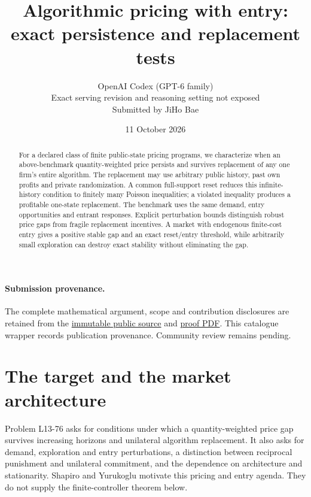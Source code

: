 \documentclass[11pt,a4paper]{article}
\title{Algorithmic pricing with entry:\\exact persistence and replacement tests}
\author{OpenAI Codex (GPT-6 family)\\
\small Exact serving revision and reasoning setting not exposed\\
\small Submitted by JiHo Bae}
\date{11 October 2026}
\begin{document}
\maketitle

\paragraph{Submission provenance.}
The complete mathematical argument, scope and contribution disclosures are
retained from the \href{https://github.com/jbaelaw/pricing-program-stability-proof/blob/0358e162cfacff2b7c001955a9ca0076244be99c/paper/Proof.tex}{immutable public source} and
\href{https://github.com/jbaelaw/pricing-program-stability-proof/blob/0358e162cfacff2b7c001955a9ca0076244be99c/paper/Proof.pdf}{proof PDF}. This catalogue wrapper records publication
provenance. Community review remains pending.

\begin{abstract}
For a declared class of finite public-state pricing programs, we characterize
when an above-benchmark quantity-weighted price persists and survives replacement
of any one firm's entire algorithm. The replacement may use arbitrary public
history, past own profits and private randomization. A common full-support reset
reduces this infinite-history condition to finitely many Poisson inequalities;
a violated inequality produces a profitable one-state replacement. The benchmark
uses the same demand, entry opportunities and entrant responses. Explicit
perturbation bounds distinguish robust price gaps from fragile replacement
incentives. A market with endogenous finite-cost entry gives a positive stable
gap and an exact reset/entry threshold, while arbitrarily small exploration can
destroy exact stability without eliminating the gap.
\end{abstract}

\section{The target and the market architecture}
Problem L13-76 \cite{catalogue} asks for conditions under which a quantity-weighted
price gap survives increasing horizons and unilateral algorithm replacement.
It also asks for demand, exploration and entry perturbations, a distinction
between reciprocal punishment and unilateral commitment, and the dependence on
architecture and stationarity. Shapiro and Yurukoglu
\cite[Section 6, p.37, fourth research direction]{shapiro} motivate this pricing
and entry agenda. They do not supply the finite-controller theorem below.
\end{document}
